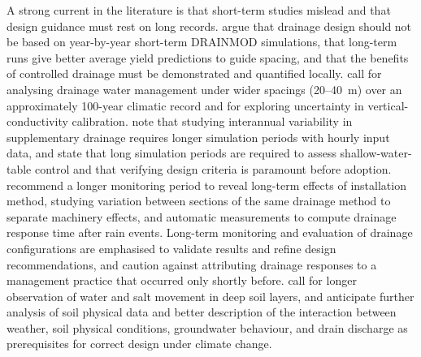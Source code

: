 \documentclass[11pt]{article}
\begin{document}
A strong current in the literature is that short-term studies mislead and that
design guidance must rest on long records. \textcite{Wang2006b} argue that
drainage design should not be based on year-by-year short-term DRAINMOD
simulations, that long-term runs give better average yield predictions to
guide spacing, and that the benefits of controlled drainage must be
demonstrated and quantified locally. \textcite{Ale2009} call for analysing
drainage water management under wider spacings (20--40~m) over an approximately
100-year climatic record and for exploring uncertainty in vertical-conductivity
calibration. \textcite{Häggblom2019} note that studying interannual
variability in supplementary drainage requires longer simulation periods with
hourly input data, and \textcite{Malota2015} state that long simulation
periods are required to assess shallow-water-table control and that verifying
design criteria is paramount before adoption. \textcite{Salo2019} recommend a
longer monitoring period to reveal long-term effects of installation method,
studying variation between sections of the same drainage method to separate
machinery effects, and automatic measurements to compute drainage response time
after rain events. Long-term monitoring and
evaluation of drainage configurations are emphasised to validate results and
refine design recommendations, and \textcite{Kladivko2023} caution against attributing
drainage responses to a management practice that occurred only shortly before.
\textcite{Chang2012} call for longer observation of water and salt movement in
deep soil layers, and \textcite{Deelstra2015} anticipate further analysis of
soil physical data and better description of the interaction between weather,
soil physical conditions, groundwater behaviour, and drain discharge as
prerequisites for correct design under climate change.
\end{document}
